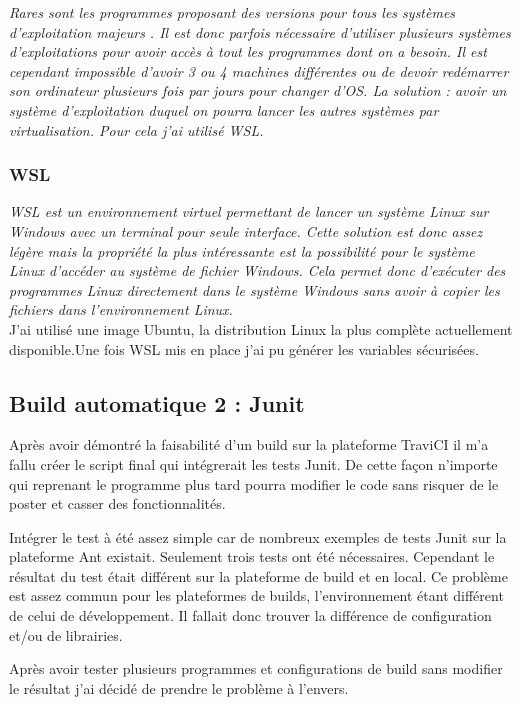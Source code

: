 \documentclass[french,a4paper,12pt]{report}
\begin{document}
\textit{Rares sont les programmes proposant des versions pour tous les systèmes d’exploitation majeurs . Il est donc parfois nécessaire d’utiliser plusieurs systèmes d’exploitations pour avoir accès à tout les programmes dont on a besoin.  Il est cependant impossible d’avoir 3 ou 4 machines différentes ou de devoir redémarrer son ordinateur plusieurs fois par jours pour changer d’OS. La solution : avoir un système d’exploitation duquel on pourra lancer les autres systèmes par virtualisation. Pour cela j’ai utilisé WSL.}

\subsubsection{WSL}

\textit{WSL est un environnement virtuel permettant de lancer un système Linux sur Windows avec un terminal pour seule interface. Cette solution est donc assez légère mais la propriété la plus intéressante est la possibilité pour le système Linux d’accéder au système de fichier Windows. Cela permet donc d’exécuter des programmes Linux directement dans le système Windows sans avoir à copier les fichiers dans l’environnement Linux.}\\

J’ai utilisé une image Ubuntu, la distribution Linux la plus complète actuellement disponible.Une fois WSL mis en place j’ai pu générer les variables sécurisées.

\subsection{Build automatique 2 : Junit}

Après avoir démontré la faisabilité d’un build sur la plateforme TraviCI il m’a fallu créer le script final qui intégrerait les tests Junit. De cette façon n’importe qui reprenant le programme plus tard pourra modifier le code sans risquer de le poster et casser des fonctionnalités.

Intégrer le test à été assez simple car de nombreux exemples de tests Junit sur la plateforme Ant existait. Seulement trois tests ont été nécessaires. Cependant le résultat du test était différent sur la plateforme de build et en local. Ce problème est assez commun pour les plateformes de builds, l’environnement étant différent de celui de développement. Il fallait donc trouver la différence de configuration et/ou de librairies.

Après avoir tester plusieurs programmes et configurations de build sans modifier le résultat j’ai décidé de prendre le problème à l’envers.
\end{document}
